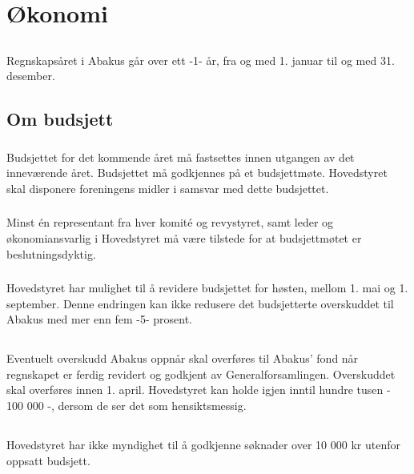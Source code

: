 \section{Økonomi}

\subsection{}
Regnskapsåret i Abakus går over ett -1- år, fra og med 1. januar til og med 31. desember.

\subsection{Om budsjett}
\subsubsection{}
Budsjettet for det kommende året må fastsettes innen utgangen av det inneværende året. Budsjettet må godkjennes på et budsjettmøte. Hovedstyret skal disponere foreningens midler i samsvar med dette budsjettet.

\subsubsection{}
Minst én representant fra hver komité og revystyret, samt leder og økonomiansvarlig i Hovedstyret må være tilstede for at budsjettmøtet er beslutningsdyktig.

\subsubsection{}
Hovedstyret har mulighet til å revidere budsjettet for høsten, mellom 1. mai og 1. september.
Denne endringen kan ikke redusere det budsjetterte overskuddet til Abakus med mer enn fem -5- prosent.

\subsection{}
Eventuelt overskudd Abakus oppnår skal overføres til Abakus’ fond når regnskapet er ferdig revidert og godkjent av Generalforsamlingen. Overskuddet skal overføres innen 1. april. Hovedstyret kan holde igjen inntil hundre tusen - 100 000 -, dersom de ser det som hensiktsmessig.

\subsection{}
Hovedstyret har ikke myndighet til å godkjenne søknader over 10 000 kr utenfor
oppsatt budsjett.
